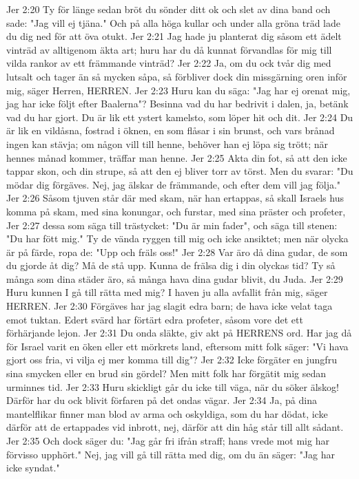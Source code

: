 Jer 2:20  Ty för länge sedan bröt du sönder ditt ok och slet av dina band och sade: "Jag vill ej tjäna." Och på alla höga kullar och under alla gröna träd lade du dig ned för att öva otukt.
Jer 2:21  Jag hade ju planterat dig såsom ett ädelt vinträd av alltigenom äkta art; huru har du då kunnat förvandlas för mig till vilda rankor av ett främmande vinträd?
Jer 2:22  Ja, om du ock tvår dig med lutsalt och tager än så mycken såpa, så förbliver dock din missgärning oren inför mig, säger Herren, HERREN.
Jer 2:23  Huru kan du säga: "Jag har ej orenat mig, jag har icke följt efter Baalerna"? Besinna vad du har bedrivit i dalen, ja, betänk vad du har gjort. Du är lik ett ystert kamelsto, som löper hit och dit.
Jer 2:24  Du är lik en vildåsna, fostrad i öknen, en som flåsar i sin brunst, och vars brånad ingen kan stävja; om någon vill till henne, behöver han ej löpa sig trött; när hennes månad kommer, träffar man henne.
Jer 2:25  Akta din fot, så att den icke tappar skon, och din strupe, så att den ej bliver torr av törst. Men du svarar: "Du mödar dig förgäves. Nej, jag älskar de främmande, och efter dem vill jag följa."
Jer 2:26  Såsom tjuven står där med skam, när han ertappas, så skall Israels hus komma på skam, med sina konungar, och furstar, med sina präster och profeter,
Jer 2:27  dessa som säga till trästycket: "Du är min fader", och säga till stenen: "Du har fött mig." Ty de vända ryggen till mig och icke ansiktet; men när olycka är på färde, ropa de: "Upp och fräls oss!"
Jer 2:28  Var äro då dina gudar, de som du gjorde åt dig? Må de stå upp. Kunna de frälsa dig i din olyckas tid? Ty så många som dina städer äro, så många hava dina gudar blivit, du Juda.
Jer 2:29  Huru kunnen I gå till rätta med mig? I haven ju alla avfallit från mig, säger HERREN.
Jer 2:30  Förgäves har jag slagit edra barn; de hava icke velat taga emot tuktan. Edert svärd har förtärt edra profeter, såsom vore det ett förhärjande lejon.
Jer 2:31  Du onda släkte, giv akt på HERRENS ord. Har jag då för Israel varit en öken eller ett mörkrets land, eftersom mitt folk säger: "Vi hava gjort oss fria, vi vilja ej mer komma till dig"?
Jer 2:32  Icke förgäter en jungfru sina smycken eller en brud sin gördel? Men mitt folk har förgätit mig sedan urminnes tid.
Jer 2:33  Huru skickligt går du icke till väga, när du söker älskog! Därför har du ock blivit förfaren på det ondas vägar.
Jer 2:34  Ja, på dina mantelflikar finner man blod av arma och oskyldiga, som du har dödat, icke därför att de ertappades vid inbrott, nej, därför att din håg står till allt sådant.
Jer 2:35  Och dock säger du: "Jag går fri ifrån straff; hans vrede mot mig har förvisso upphört." Nej, jag vill gå till rätta med dig, om du än säger: "Jag har icke syndat."
